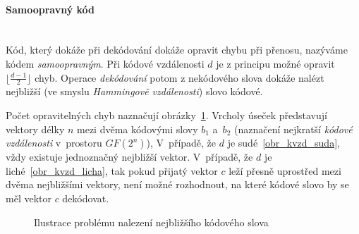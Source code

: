 \documentclass[thesis=M,czech,hidelinks]{FITthesis}[2012/06/26]
\newcommand{\0}{{\textcolor[gray]{0.80}{0}}}
\begin{document}
\paragraph{Samoopravný kód} \hfil \\
Kód, který dokáže při dekódování dokáže opravit chybu při přenosu, nazýváme
kódem \emph{samoopravným}. Při kódové vzdálenosti $d$ je z principu možné
opravit $\lfloor \frac{d-1}{2} \rfloor$ chyb. Operace \emph{dekódování} potom z
nekódového slova dokáže nalézt nejbližší (ve smyslu \emph{Hammingově
vzdálenosti}) slovo kódové.


Počet opravitelných chyb naznačují obrázky~\ref{obr_kvzd}. Vrcholy úseček
představují vektory délky $n$ mezi dvěma kódovými slovy $b_1$ a~$b_2$ (naznačení
nejkratší \emph{kódové vzdálenosti} v~prostoru $GF(2^n)$), V~případě, že $d$ je
sudé~\ref{obr_kvzd_suda}, vždy existuje jednoznačný nejbližší vektor. V~případě,
že $d$ je liché~\ref{obr_kvzd_licha}, tak pokud přijatý vektor $c$ leží přesně
uprostřed mezi dvěma nejbližšími vektory, není možné rozhodnout, na které kódové
slovo by se měl vektor $c$ dekódovat.

\begin{figure}
    \centering
    \quad
    \label{obr_kvzd}
    \caption{Ilustrace problému nalezení nejbližšího kódového slova}
\end{figure}
\end{document}
